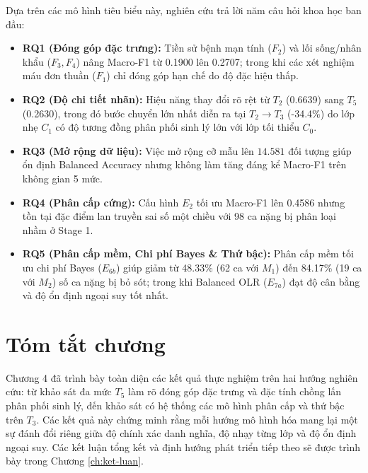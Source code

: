 Dựa trên các mô hình tiêu biểu này, nghiên cứu trả lời năm câu hỏi khoa học ban đầu:
\begin{itemize}
    \item \textbf{RQ1 (Đóng góp đặc trưng):} Tiền sử bệnh mạn tính ($F_2$) và lối sống/nhân khẩu ($F_3, F_4$) nâng Macro-F1 từ 0.1900 lên 0.2707; trong khi các xét nghiệm máu đơn thuần ($F_1$) chỉ đóng góp hạn chế do độ đặc hiệu thấp.
    \item \textbf{RQ2 (Độ chi tiết nhãn):} Hiệu năng thay đổi rõ rệt từ $T_2$ (0.6639) sang $T_5$ (0.2630), trong đó bước chuyển lớn nhất diễn ra tại $T_2 \to T_3$ (-34.4\%) do lớp nhẹ $C_1$ có độ tương đồng phân phối sinh lý lớn với lớp tối thiểu $C_0$.
    \item \textbf{RQ3 (Mở rộng dữ liệu):} Việc mở rộng cỡ mẫu lên $14.581$ đối tượng giúp ổn định Balanced Accuracy nhưng không làm tăng đáng kể Macro-F1 trên không gian 5 mức.
    \item \textbf{RQ4 (Phân cấp cứng):} Cấu hình $E_2$ tối ưu Macro-F1 lên 0.4586 nhưng tồn tại đặc điểm lan truyền sai số một chiều với 98 ca nặng bị phân loại nhầm ở Stage 1.
    \item \textbf{RQ5 (Phân cấp mềm, Chi phí Bayes \& Thứ bậc):} Phân cấp mềm tối ưu chi phí Bayes ($E_{6b}$) giúp giảm từ 48.33\% (62 ca với $M_1$) đến 84.17\% (19 ca với $M_2$) số ca nặng bị bỏ sót; trong khi Balanced OLR ($E_{7a}$) đạt độ cân bằng và độ ổn định ngoại suy tốt nhất.
\end{itemize}

\section{Tóm tắt chương}
\label{sec:tom-tat-chuong-4}

Chương 4 đã trình bày toàn diện các kết quả thực nghiệm trên hai hướng nghiên cứu: từ khảo sát đa mức $T_5$ làm rõ đóng góp đặc trưng và đặc tính chồng lấn phân phối sinh lý, đến khảo sát có hệ thống các mô hình phân cấp và thứ bậc trên $T_3$. Các kết quả này chứng minh rằng mỗi hướng mô hình hóa mang lại một sự đánh đổi riêng giữa độ chính xác danh nghĩa, độ nhạy từng lớp và độ ổn định ngoại suy. Các kết luận tổng kết và định hướng phát triển tiếp theo sẽ được trình bày trong Chương \ref{ch:ket-luan}.
